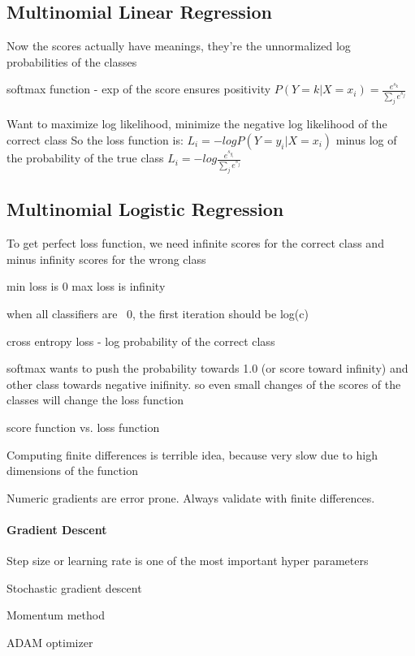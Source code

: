 \subsection{Multinomial Linear Regression}

Now the scores actually have meanings, they're the unnormalized log probabilities of the classes

softmax function - exp of the score ensures positivity
$ P(Y=k|X=x_i) = \frac{e^{s_k}}{\sum_j e^{s_j}} $

Want to maximize log likelihood, minimize the negative log likelihood of the correct class
So the loss function is:
$ L_i = - log P(Y=y_i|X=x_i) $
minus log of the probability of the true class
$ L_i = - log \frac{e^{s_{y_i}}}{\sum_j e^{s_j}} $

\subsection{Multinomial Logistic Regression}

To get perfect loss function, we need infinite scores for the correct class and minus infinity scores for the wrong class

min loss is 0 
max loss is infinity

when all classifiers are ~0, the first iteration should be log(c)

cross entropy loss
- log probability of the correct class

softmax wants to push the probability towards 1.0 (or score toward infinity) and other class towards negative inifinity. so even small changes of the scores of the classes will change the loss function

score function vs. loss function

Computing finite differences is terrible idea, because very slow due to high dimensions of the function

Numeric gradients are error prone.
Always validate with finite differences. 

\paragraph{Gradient Descent}

Step size or learning rate is one of the most important hyper parameters

Stochastic gradient descent

Momentum method

ADAM optimizer

